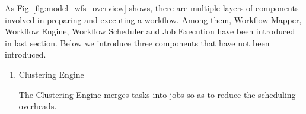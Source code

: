 As Fig~\ref{fig:model_wfs_overview} shows, there are multiple layers of components involved in preparing and executing a workflow. Among them, Workflow Mapper, Workflow Engine, Workflow Scheduler and Job Execution have been introduced in last section. Below we introduce three components that have not been introduced. 
\begin{enumerate}

\item Clustering Engine

The Clustering Engine merges tasks into jobs so as to reduce the scheduling overheads. 


  






\end{enumerate}
